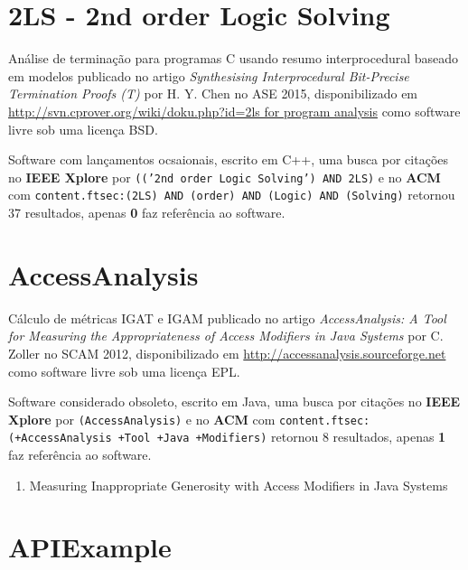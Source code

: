 

\label{softwares-summary}

\section{2LS - 2nd order Logic Solving}

Análise de terminação para programas C usando resumo interprocedural baseado em modelos
publicado no artigo {\it Synthesising Interprocedural Bit-Precise Termination Proofs (T)}
por H. Y. Chen
no ASE 2015,
disponibilizado em \url{http://svn.cprover.org/wiki/doku.php?id=2ls for program analysis}
como software livre
sob uma licença BSD.

Software com lançamentos ocsaionais,
escrito em C++,
uma busca por citações no {\bf IEEE Xplore} por
\texttt{(('2nd order Logic Solving') AND 2LS)}
e no {\bf ACM} com
\texttt{content.ftsec:(2LS) AND (order) AND (Logic) AND (Solving)}
retornou
37 resultados, apenas
{\bf 0} faz referência ao software.



\section{AccessAnalysis}

Cálculo de métricas IGAT e IGAM
publicado no artigo {\it AccessAnalysis: A Tool for Measuring the Appropriateness of Access Modifiers in Java Systems}
por C. Zoller
no SCAM 2012,
disponibilizado em \url{http://accessanalysis.sourceforge.net}
como software livre
sob uma licença EPL.

Software considerado obsoleto,
escrito em Java,
uma busca por citações no {\bf IEEE Xplore} por
\texttt{(AccessAnalysis)}
e no {\bf ACM} com
\texttt{content.ftsec:(+AccessAnalysis +Tool +Java +Modifiers)}
retornou
8 resultados, apenas
{\bf 1} faz referência ao software.

\begin{enumerate}
\item Measuring Inappropriate Generosity with Access Modifiers in Java Systems
\end{enumerate}


\section{APIExample}

